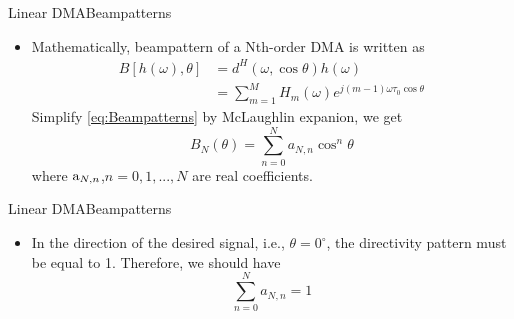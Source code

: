 \documentclass{beamer}
\begin{document}
\begin{frame}{Linear DMA}{Beampatterns}
\begin{itemize}
\item{
Mathematically, beampattern of a Nth-order DMA is written as
\begin{align}
   B[h(\omega ),\theta ]&={{d}^{H}}(\omega ,\cos \theta )h(\omega ) \\ 
 & =\sum\limits_{m=1}^{M}{{{H}_{m}}(\omega ){{e}^{j(m-1)\omega {{\tau }_{0}}\cos \theta }}} 
\label{eq:Beampatterns} 
\end{align}
Simplify \eqref{eq:Beampatterns} by McLaughlin expanion, we get
\begin{equation}
\label{eq:Beampatterns2} 
{{B}_{N}}(\theta )=\sum\limits_{n=0}^{N}{{{a}_{N,n}}{{\cos }^{n}}\theta }
\end{equation}
where $ {{\rm{a}}_{N,n}} $,$ n=0,1,...,N$ are real coefficients.

}

\end{itemize}
	
\end{frame}

\begin{frame}{Linear DMA}{Beampatterns}
\begin{itemize}
\item{
In the direction of the desired signal, i.e., $\theta  = {0^ \circ }$, the directivity pattern must be equal to 1. Therefore, we should have
\begin{equation}
\sum\limits_{n=0}^{N}{{{a}_{N,n}}}=1
\end{equation}

}
\end{itemize}
	
\end{frame}
\end{document}
